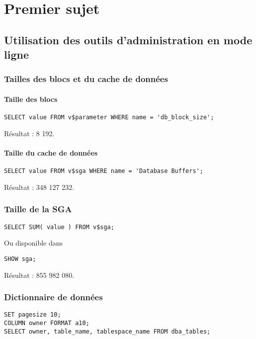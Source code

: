 \section{Premier sujet}
\subsection{Utilisation des outils d’administration en mode ligne}

\subsubsection{Tailles des blocs et du cache de données}

\paragraph{Taille des blocs}
\begin{verbatim}
SELECT value FROM v$parameter WHERE name = 'db_block_size';
\end{verbatim}

Résultat : 8 192.

\paragraph{Taille du cache de données}
\begin{verbatim}
SELECT value FROM v$sga WHERE name = 'Database Buffers';
\end{verbatim}

Résultat : 348 127 232.

\subsubsection{Taille de la SGA}

\begin{verbatim}
SELECT SUM( value ) FROM v$sga;
\end{verbatim}

Ou disponible dans 
\begin{verbatim}
SHOW sga;
\end{verbatim}

Résultat : 855 982 080.

\subsubsection{Dictionnaire de données}

\begin{verbatim}
SET pagesize 10;
COLUMN owner FORMAT a10;
SELECT owner, table_name, tablespace_name FROM dba_tables;
\end{verbatim}


